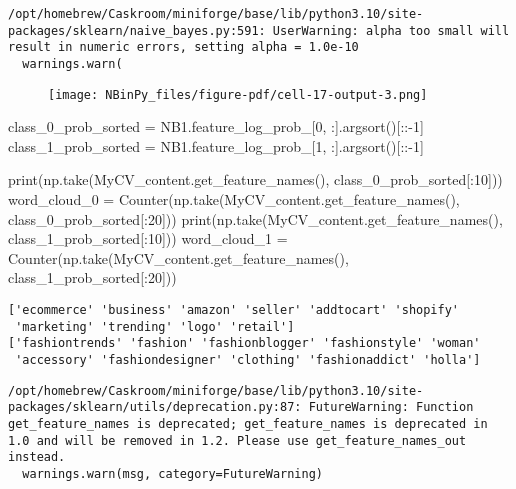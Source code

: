 \documentclass[
  letterpaper,
  DIV=11,
  numbers=noendperiod]{scrartcl}
\newenvironment{Shaded}{\begin{snugshade}}{\end{snugshade}}
\newcommand{\BuiltInTok}[1]{\textcolor[rgb]{0.00,0.23,0.31}{#1}}
\newcommand{\DecValTok}[1]{\textcolor[rgb]{0.68,0.00,0.00}{#1}}
\newcommand{\NormalTok}[1]{\textcolor[rgb]{0.00,0.23,0.31}{#1}}
\newcommand{\OperatorTok}[1]{\textcolor[rgb]{0.37,0.37,0.37}{#1}}
\begin{document}
\begin{verbatim}
/opt/homebrew/Caskroom/miniforge/base/lib/python3.10/site-packages/sklearn/naive_bayes.py:591: UserWarning: alpha too small will result in numeric errors, setting alpha = 1.0e-10
  warnings.warn(
\end{verbatim}

\begin{figure}[H]

{\centering \texttt{[image: NBinPy\_files/figure-pdf/cell-17-output-3.png]}

}

\end{figure}

\begin{Shaded}
\begin{Highlighting}[]
\NormalTok{class\_0\_prob\_sorted }\OperatorTok{=}\NormalTok{ NB1.feature\_log\_prob\_[}\DecValTok{0}\NormalTok{, :].argsort()[::}\OperatorTok{{-}}\DecValTok{1}\NormalTok{]}
\NormalTok{class\_1\_prob\_sorted }\OperatorTok{=}\NormalTok{ NB1.feature\_log\_prob\_[}\DecValTok{1}\NormalTok{, :].argsort()[::}\OperatorTok{{-}}\DecValTok{1}\NormalTok{]}

\BuiltInTok{print}\NormalTok{(np.take(MyCV\_content.get\_feature\_names(), class\_0\_prob\_sorted[:}\DecValTok{10}\NormalTok{]))}
\NormalTok{word\_cloud\_0 }\OperatorTok{=}\NormalTok{ Counter(np.take(MyCV\_content.get\_feature\_names(), class\_0\_prob\_sorted[:}\DecValTok{20}\NormalTok{]))}
\BuiltInTok{print}\NormalTok{(np.take(MyCV\_content.get\_feature\_names(), class\_1\_prob\_sorted[:}\DecValTok{10}\NormalTok{])) }
\NormalTok{word\_cloud\_1 }\OperatorTok{=}\NormalTok{ Counter(np.take(MyCV\_content.get\_feature\_names(), class\_1\_prob\_sorted[:}\DecValTok{20}\NormalTok{]))}
\end{Highlighting}
\end{Shaded}

\begin{verbatim}
['ecommerce' 'business' 'amazon' 'seller' 'addtocart' 'shopify'
 'marketing' 'trending' 'logo' 'retail']
['fashiontrends' 'fashion' 'fashionblogger' 'fashionstyle' 'woman'
 'accessory' 'fashiondesigner' 'clothing' 'fashionaddict' 'holla']
\end{verbatim}

\begin{verbatim}
/opt/homebrew/Caskroom/miniforge/base/lib/python3.10/site-packages/sklearn/utils/deprecation.py:87: FutureWarning: Function get_feature_names is deprecated; get_feature_names is deprecated in 1.0 and will be removed in 1.2. Please use get_feature_names_out instead.
  warnings.warn(msg, category=FutureWarning)
\end{verbatim}
\end{document}
